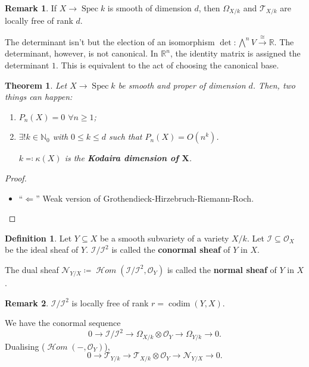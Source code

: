 \documentclass[12pt]{article}
\DeclareMathOperator{\Spec}{Spec}
\DeclareMathOperator{\shHom}{\mathcal{H}\textit{om}}
\DeclareMathOperator{\codim}{codim}
\newtheorem*{theorem}{Theorem}
\theoremstyle{definition}
\newtheorem*{definition}{Definition}
\newtheorem*{remark}{Remark}
\begin{document}
\begin{remark}
If $X\rightarrow\Spec k$ is smooth of dimension $d$, then $\Omega_{X/k}$ and $\mathcal{T}_{X/k}$ are locally free of rank $d$.
\end{remark}

The determinant isn't but the election of an isomorphism $\det:{\bigwedge}^nV\xrightarrow{\cong}\mathbb{R}$. The determinant, however, is not canonical. In $\mathbb{R}^n$, the identity matrix is assigned the determinant $1$. This is equivalent to the act of choosing the canonical base.

\begin{theorem}
Let $X\rightarrow\Spec k$ be smooth and proper of dimension $d$. Then, two things can happen:
\begin{enumerate}[label=\arabic*)]
\item $P_n(X)=0$ $\forall n\geq1$;
\item $\exists!k\in\mathbb{N}_0$ with $0\leq k\leq d$ such that $P_n(X)=O(n^k)$.

$k\eqqcolon\kappa(X)$ is the \textbf{Kodaira dimension of $\boldsymbol{X}$}.
\end{enumerate}
\end{theorem}

\begin{proof}
\begin{itemize}
\item ``$\Leftarrow$'' Weak version of Grothendieck-Hirzebruch-Riemann-Roch.
\end{itemize}
\end{proof}

\begin{definition}
Let $Y\subseteq X$ be a smooth subvariety of a variety $X/k$. Let $\mathcal{I}\subseteq\mathcal{O}_X$ be the ideal sheaf of $Y$. $\mathcal{I}/\mathcal{I}^2$ is called the \textbf{conormal sheaf} of $Y$ in $X$.

The dual sheaf $\mathcal{N}_{Y/X}\coloneqq\shHom(\mathcal{I}/\mathcal{I}^2,\mathcal{O}_Y)$ is called the \textbf{normal sheaf} of $Y$ in $X$.
\end{definition}

\begin{remark}
$\mathcal{I}/\mathcal{I}^2$ is locally free of rank $r=\codim(Y,X)$.
\end{remark}

We have the conormal sequence
\[0\longrightarrow\mathcal{I}/\mathcal{I}^2\longrightarrow\Omega_{X/k}\otimes\mathcal{O}_Y\longrightarrow\Omega_{Y/k}\longrightarrow0.\]
Dualising ($\shHom(-,\mathcal{O}_Y)$),
\[0\longrightarrow\mathcal{T}_{Y/k}\longrightarrow\mathcal{T}_{X/k}\otimes\mathcal{O}_Y\longrightarrow\mathcal{N}_{Y/X}\longrightarrow0.\]
\end{document}
